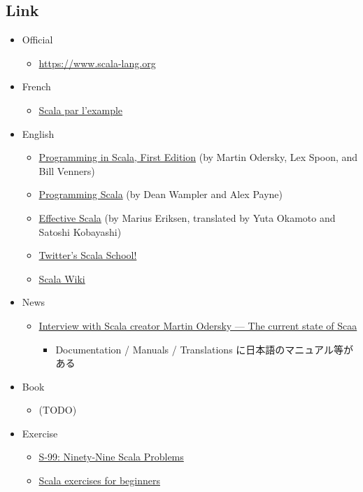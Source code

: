 \documentclass[11pt]{article}
\begin{document}
\subsection*{Link}
\label{sec:orgheadline1}
\begin{itemize}
\item Official
\begin{itemize}
\item \url{https://www.scala-lang.org}
\end{itemize}
\item French
\begin{itemize}
\item \href{http://www.scala-lang.org/docu/files/ScalaByExample-fr_FR.pdf}{Scala par l'example}
\end{itemize}
\item English
\begin{itemize}
\item \href{http://www.artima.com/pins1ed/}{Programming in Scala, First Edition} (by Martin Odersky, Lex Spoon, and Bill Venners)
\item \href{http://programming-scala.labs.oreilly.com/index.html}{Programming Scala} (by Dean Wampler and Alex Payne)
\item \href{http://twitter.github.com/effectivescala/index-ja.html}{Effective Scala} (by Marius Eriksen, translated by Yuta Okamoto and Satoshi Kobayashi)
\item \href{http://twitter.github.com/scala_school/}{Twitter's Scala School!}
\item \href{https://wiki.scala-lang.org}{Scala Wiki}
\end{itemize}
\item News
\begin{itemize}
\item \href{https://www.lightbend.com/company/news/jaxenter-interview-with-scala-creator-martin-odersky-on-the-current-state-of-scala}{Interview with Scala creator Martin Odersky — The current state of Scaa}
\begin{itemize}
\item Documentation / Manuals / Translations に日本語のマニュアル等がある
\end{itemize}
\end{itemize}
\item Book
\begin{itemize}
\item (TODO)
\end{itemize}
\item Exercise
\begin{itemize}
\item \href{http://aperiodic.net/phil/scala/s-99/}{S-99: Ninety-Nine Scala Problems}
\item \href{http://blog.tmorris.net/scala-exercises-for-beginners/}{Scala exercises for beginners}
\end{itemize}
\end{itemize}
\end{document}
